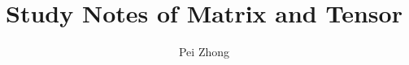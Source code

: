\documentclass[12pt,oneside]{book} %
\begin{document}
\title{\bf \huge Study Notes of Matrix and Tensor}
\author{Pei Zhong}

\maketitle


\tableofcontents

\begin{spacing}{1}





















% 

% 

% 

% 




\end{spacing}
\end{document}
